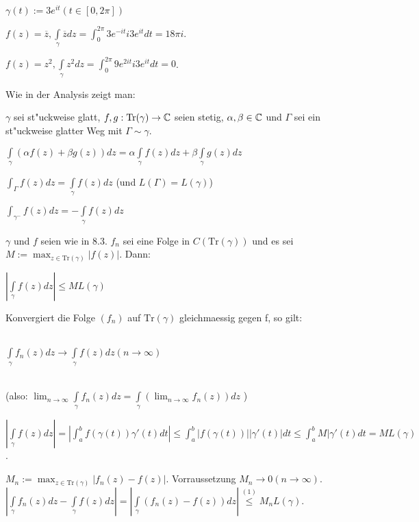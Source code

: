 \documentclass[a4paper,twoside,DIV15,BCOR12mm]{scrbook}
\def\Tr{\text{Tr}}
\def\wegint{\ensuremath{\int\limits_\gamma}}
\def\iint{\ensuremath{\int\limits}}
\begin{document}
\begin{beispiel}
$\gamma(t):=3e^{it}(t\in[0,2\pi])$ 
 \begin{liste}
 \item $f(z)=\overline{z},\wegint \overline{z}dz=\iint_0^{2\pi} 3e^{-it}i3e^{it}dt=18\pi i$.
 \item $f(z)=z^2,\wegint z^2dz=\iint_0^{2\pi} 9e^{2it}i3e^{it}dt=0$.
 \end{liste}
\end{beispiel}

Wie in der Analysis zeigt man:


\begin{samepage}\begin{satz}
$\gamma$ sei st"uckweise glatt, $f,g:\Tr(\gamma)\to\MdC$ seien stetig, $\alpha,\beta\in\mathbb{C}$ und $\Gamma$ sei ein st"uckweise glatter Weg mit $\Gamma \sim \gamma$.
 \begin{liste}
  \item $\wegint(\alpha f(z)+\beta g(z))dz=\alpha\wegint f(z)dz + \beta\wegint g(z)dz$
  \item $\iint_\Gamma f(z)dz=\wegint f(z)dz$ (und $L(\Gamma) = L(\gamma)$)
  \item $\iint_{\gamma^-}f(z)dz=-\wegint f(z)dz$
 \end{liste}
\end{satz}\end{samepage}


\begin{samepage}
\begin{satz}
$\gamma$ und $f$ seien wie in 8.3. $f_n$ sei eine Folge in $C(\Tr(\gamma))$ und es sei $M:=\max_{z\in\Tr(\gamma)}|f(z)|$. Dann: 
\begin{liste}
\item $|\wegint f(z)dz| \le M L(\gamma)$\\
\item Konvergiert die Folge $(f_n)$ auf $\Tr(\gamma)$ gleichmaessig gegen f, so gilt: \\ \\ 
\centerline{$\wegint f_n(z)dz \to\wegint f(z)dz (n\to\infty)$}\\
(also: $\lim_{n\to\infty}\wegint f_n(z)dz = \wegint(\lim_{n\to\infty}f_n(z))dz$ )
\end{liste}
\end{satz}
\end{samepage}

\begin{beweis}
\begin{liste}
   \item $|\wegint f(z)dz| = |\iint_a^bf(\gamma(t))\gamma'(t)dt|\le \iint_a^b|f(\gamma(t))||\gamma'(t)|dt\le\iint_a^b M |\gamma'(t)dt=M L(\gamma)$.
   \item $M_n:=\max_{z\in\Tr(\gamma)}|f_n(z)-f(z)|$. Vorraussetzung \folgt $M_n\to 0(n\to\infty)$.\\
        $|\wegint f_n(z)dz-\wegint f(z)dz|=|\wegint(f_n(z)-f(z))dz| \stackrel{(1)}{\leq} M_n L(\gamma)$.
\end{liste}
\end{beweis}
\end{document}
